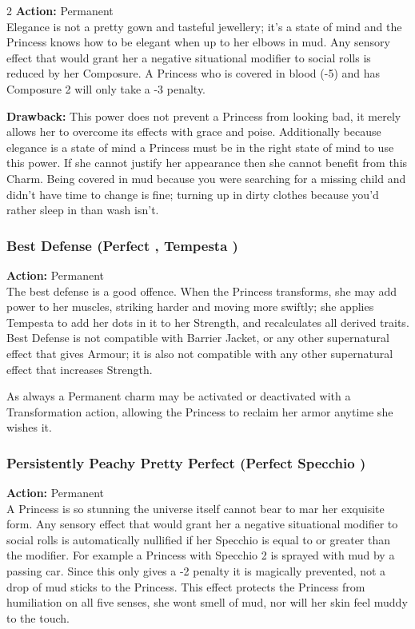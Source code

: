 \begin{multicols}{2}
\noindent \textbf{Action:} Permanent \\

\noindent Elegance is not a pretty gown and tasteful jewellery; it's a state of mind and the Princess knows how to be elegant when up to her elbows in mud. Any sensory effect that would grant her a negative situational modifier to social rolls is reduced by her Composure. A Princess who is covered in blood (-5) and has Composure 2 will only take a -3 penalty.

\textbf{Drawback:} This power does not prevent a Princess from looking bad, it merely allows her to overcome its effects with grace and poise. Additionally because elegance is a state of mind a Princess must be in the right state of mind to use this power. If she cannot justify her appearance then she cannot benefit from this Charm. Being covered in mud because you were searching for a missing child and didn't have time to change is fine; turning up in dirty clothes because you'd rather sleep in than wash isn't.

\subsubsection*{Best Defense (Perfect \textbullet\textbullet, Tempesta \textbullet)}

\noindent \textbf{Action:} Permanent \\

\noindent The best defense is a good offence. When the Princess transforms, she may add power to her muscles, striking harder and moving more swiftly; she applies Tempesta to add her dots in it to her Strength, and recalculates all derived traits. Best Defense is not compatible with Barrier Jacket, or any other supernatural effect that gives Armour; it is also not compatible with any other supernatural effect that increases Strength.

As always a Permanent charm may be activated or deactivated with a Transformation action, allowing the Princess to reclaim her armor anytime she wishes it. 

\subsubsection*{Persistently Peachy Pretty Perfect (Perfect \textbullet\textbullet Specchio \textbullet)}

\noindent \textbf{Action:} Permanent \\

\noindent A Princess is so stunning the universe itself cannot bear to mar her exquisite form. Any sensory effect that would grant her a negative situational modifier to social rolls is automatically nullified if her Specchio is equal to or greater than the modifier. For example a Princess with Specchio 2 is sprayed with mud by a passing car. Since this only gives a -2 penalty it is magically prevented, not a drop of mud sticks to the Princess. This effect protects the Princess from humiliation on all five senses, she wont smell of mud, nor will her skin feel muddy to the touch.


\end{multicols}
